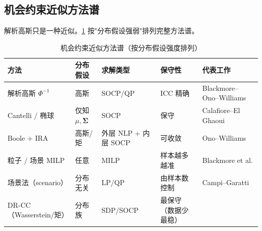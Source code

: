 \subsection{机会约束近似方法谱}
\label{sec:cc-spectrum}

解析高斯只是一种近似。\cref{tab:cc-spectrum} 按"分布假设强弱"排列完整方法谱。

\begin{table}[H]\centering\small
\caption{机会约束近似方法谱（按分布假设强度排列）}
\label{tab:cc-spectrum}
\begin{tabular}{lllll}
\toprule
方法 & 分布假设 & 求解类型 & 保守性 & 代表工作 \\
\midrule
解析高斯 $\Phi^{-1}$ & 高斯 & SOCP/QP & ICC 精确 & Blackmore--Ono--Williams\cite{blackmore2011chance} \\
Cantelli / 椭球 & 仅知 $\mu,\boldsymbol{\Sigma}$ & SOCP & 保守 & Calafiore--El Ghaoui\cite{calafiore2006distributionally} \\
Boole + IRA & 高斯/矩 & 外层 NLP + 内层 SOCP & 可收敛 & Ono--Williams\cite{ono2008iterative} \\
粒子 / 场景 MILP & 任意 & MILP & 样本越多越准 & Blackmore et al.\cite{blackmore2010probabilistic} \\
场景法（scenario） & 分布无关 & LP/QP & 由样本数控制 & Campi--Garatti\cite{campi2008exact} \\
DR-CC（Wasserstein/矩）& 分布族 & SDP/SOCP & 最保守（数据少最稳）& \cite{calafiore2006distributionally} \\
\bottomrule
\end{tabular}
\end{table}


